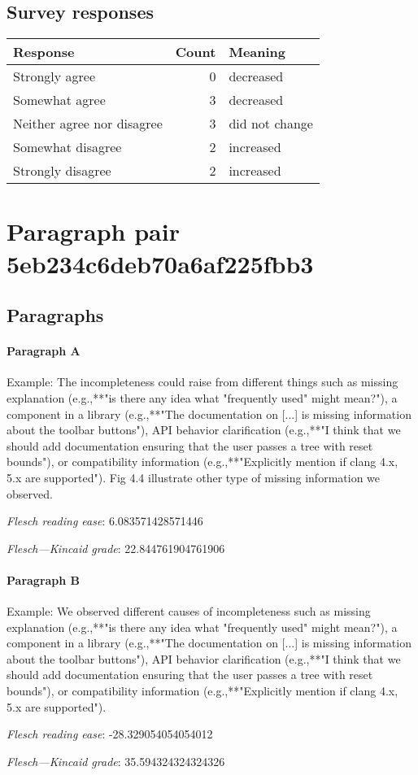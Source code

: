 \subsection{Survey responses}
\begin{tabular}{lrl}
\toprule
          \textbf{Response} &  \textbf{Count} & \textbf{Meaning} \\
\midrule
             Strongly agree &               0 &        decreased \\
             Somewhat agree &               3 &        decreased \\
 Neither agree nor disagree &               3 &   did not change \\
          Somewhat disagree &               2 &        increased \\
          Strongly disagree &               2 &        increased \\
\bottomrule
\end{tabular}

\section{Paragraph pair 5eb234c6deb70a6af225fbb3}
\subsection{Paragraphs}
\paragraph{Paragraph A}
Example: The incompleteness could raise from different things such as missing explanation (e.g.,**"is there any idea what "frequently used" might mean?"), a component in a library (e.g.,**"The documentation on [...] is missing information about the toolbar buttons"), API behavior clarification (e.g.,**"I think that we should add documentation ensuring that the user passes a tree with reset bounds"), or compatibility information (e.g.,**"Explicitly mention if clang 4.x, 5.x are supported"). Fig 4.4 illustrate other type of missing information we observed.\par\medskip\emph{Flesch reading ease}: 6.083571428571446\par\emph{Flesch---Kincaid grade}: 22.844761904761906

\paragraph{Paragraph B}
Example: We observed different causes of incompleteness such as missing explanation (e.g.,**"is there any idea what "frequently used" might mean?"), a component in a library (e.g.,**"The documentation on [...] is missing information about the toolbar buttons"), API behavior clarification (e.g.,**"I think that we should add documentation ensuring that the user passes a tree with reset bounds"), or compatibility information (e.g.,**"Explicitly mention if clang 4.x, 5.x are supported").\par\medskip\emph{Flesch reading ease}: -28.329054054054012\par\emph{Flesch---Kincaid grade}: 35.594324324324326

